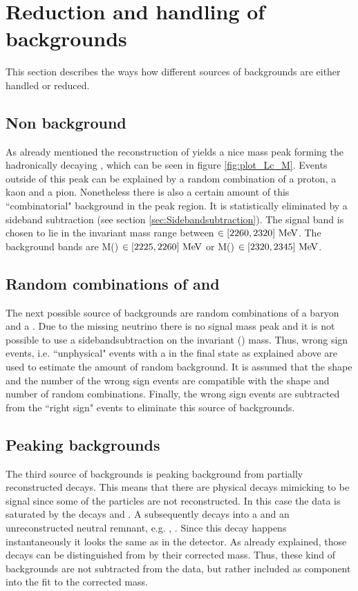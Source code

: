 \section{Reduction and handling of backgrounds}
This section describes the ways how different sources of backgrounds are either handled or reduced.

\subsection{Non \Lc background}
As already mentioned the reconstruction of \pKpi yields a nice mass peak forming the hadronically decaying \Lc, which can be seen in figure \ref{fig:plot_Lc_M}. 
Events outside of this peak can be explained by a random combination of a proton, a kaon and a pion.
Nonetheless there is also a certain amount of this ``combinatorial" background in the peak region.
It is statistically eliminated by a sideband subtraction (see section \ref{sec:Sidebandsubtraction}).
The signal band is chosen to lie in the invariant \pKpi mass range between $\in \left[2260, 2320\right]\mathrm{\,Me\kern -0.1em V}$.
The background bands are M(\pKpi) $\in \left[2225, 2260\right]\mathrm{\,Me\kern -0.1em V}$ or M(\pKpi) $\in \left[2320, 2345\right]\mathrm{\,Me\kern -0.1em V}$.

\subsection{Random combinations of \Lc and \mun}
The next possible source of backgrounds are random combinations of a \Lc baryon and a \mun. 
Due to the missing neutrino \neumb there is no signal mass peak and it is not possible to use a sidebandsubtraction on the invariant \pKpi\mun (\Lc\mun) mass.
Thus, wrong sign events, i.e. ``unphysical" events with a \Lc\mup in the final state as explained above are used to estimate the amount of random \Lc\mun background.
It is assumed that the shape and the number of the wrong sign events are compatible with the shape and number of random \Lc\mun combinations.
Finally, the wrong sign events are subtracted from the ``right sign" events to eliminate this source of backgrounds.

\subsection{Peaking backgrounds}
The third source of backgrounds is peaking background from partially reconstructed decays.
This means that there are physical decays mimicking to be signal since some of the particles are not reconstructed.
In this case the data is saturated by the decays  and  \cite{SL_Vub}.
A \Lcstar subsequently decays into a \Lc and an unreconstructed neutral remnant, e.g. \piz, \pip\pim.
Since this decay happens instantaneously it looks the same as \LcTopKpi in the detector.
As already explained, those decays can be distinguished from \LbToLcmunu by their corrected \Lb mass.
Thus, these kind of backgrounds are not subtracted from the data, but rather included as component into the fit to the corrected \Lb mass.

